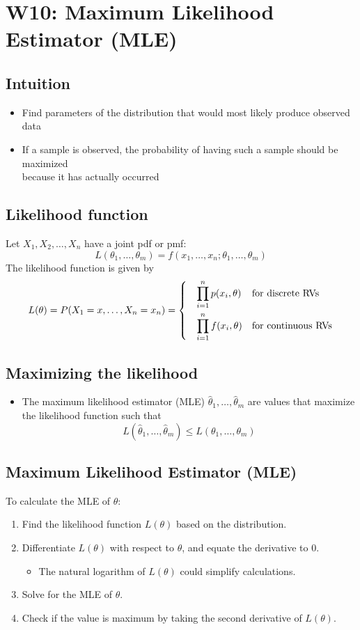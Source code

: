 \documentclass[a4paper]{article}
\begin{document}
\section{W10: Maximum Likelihood Estimator (MLE)}
\subsection{Intuition}
\begin{itemize}
    \item Find parameters of the distribution that would most likely produce observed data
    \item If a sample is observed, the probability of having such a sample should be maximized \\because it has actually occurred
\end{itemize}
\subsection{Likelihood function}
Let $X_{1}, X_{2}, \ldots , X_{n}$ have a joint pdf or pmf:
$$L(\theta_{1}, \ldots, \theta_{m}) = f(x_{1}, \ldots, x_{n}; \theta_{1}, \ldots, \theta_{m})$$
The likelihood function is given by
\begin{align*}
    L(\theta) = P(X_{1}=x, \ldots, X_{n}=x_{n}) = \begin{dcases}
    \quad \prod_{i=1}^{n} p(x_{i}, \theta) &\mbox{for discrete RVs}\\
    \quad \prod_{i=1}^{n} f(x_{i}, \theta) &\mbox{for continuous RVs}
    \end{dcases}
\end{align*}
\subsection{Maximizing the likelihood}
\begin{itemize}
    \item The maximum likelihood estimator (MLE) $\hat{\theta}_{1}, \ldots, \hat{\theta}_{m}$ are values that maximize the likelihood function such that
    $$L(\hat{\theta}_{1}, \ldots, \hat{\theta}_{m})\leq L(\theta_{1}, \ldots, \theta_{m})
    $$
\end{itemize}
\subsection{Maximum Likelihood Estimator (MLE)}
To calculate the MLE of $\theta$:
\begin{enumerate}
    \item Find the likelihood function $L(\theta)$ based on the distribution.
    \item Differentiate $L(\theta)$ with respect to $\theta$, and equate the derivative to 0.
    \begin{itemize}[label=$\circ$]
        \item The natural logarithm of $L(\theta)$ could simplify calculations.
    \end{itemize}
    \item Solve for the MLE of $\theta$.
    \item Check if the value is maximum by taking the second derivative of $L(\theta)$.
\end{enumerate}
\newpage
\end{document}
